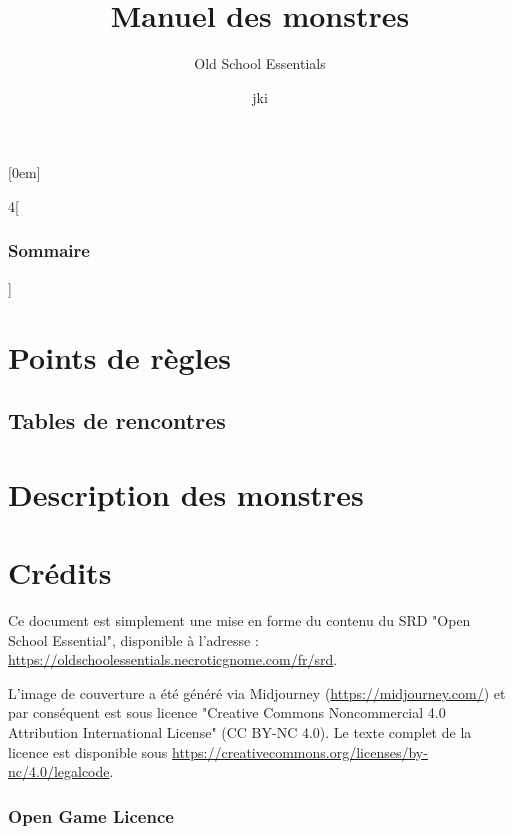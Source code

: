 \documentclass[10pt]{report}
\title{Manuel des monstres}
\subtitle{Old School Essentials}
\author{jki}
\makeatletter
\renewcommand\tableofcontents{%
	\@starttoc{toc}%
}
\makeatother
\begin{document}
\maketitle

[0em]
{\small}%
{}%
{}%
{\contentspage}%
\renewcommand{\baselinestretch}{0.5}\normalsize
\renewcommand{\contentsname}{Sommaire}
\begin{multicols}{4}[\section*{\contentsname}]
\tableofcontents
\end{multicols}
\renewcommand{\baselinestretch}{1.0}\normalsize

\part{Points de règles}


\chapter{Tables de rencontres}

\pagebreak

\pagebreak


\part{Description des monstres}

%
	
\part{Crédits}	

Ce document est simplement une mise en forme du contenu du SRD "Open School Essential", disponible à l'adresse :
\url{https://oldschoolessentials.necroticgnome.com/fr/srd}.

L'image de couverture a été généré via Midjourney (\url{https://midjourney.com/}) et par conséquent est sous licence "Creative Commons Noncommercial 4.0 Attribution International License" (CC BY-NC 4.0).
Le texte complet de la licence est disponible sous \url{https://creativecommons.org/licenses/by-nc/4.0/legalcode}.

\section*{Open Game Licence}

	
\end{document}
